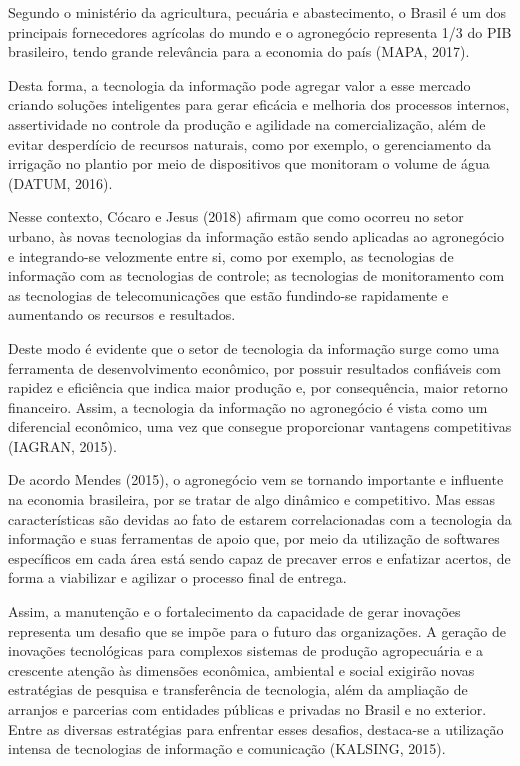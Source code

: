 \documentclass[eso]{bcc}
\begin{document}
Segundo o ministério da agricultura, pecuária e abastecimento, o Brasil é um dos principais 
fornecedores agrícolas do mundo e o agronegócio representa 1/3 do PIB brasileiro, tendo grande 
relevância para a economia do país (MAPA, 2017).

Desta forma, a tecnologia da informação pode agregar valor a esse mercado criando soluções 
inteligentes para gerar eficácia e melhoria dos processos internos, assertividade no controle da 
produção e agilidade na comercialização, além de evitar desperdício de recursos naturais, como 
por exemplo, o gerenciamento da irrigação no plantio por meio de dispositivos que monitoram o 
volume de água (DATUM, 2016).

Nesse contexto, Cócaro e Jesus (2018) afirmam que como ocorreu no setor urbano, às novas 
tecnologias da informação estão sendo aplicadas ao agronegócio e integrando-se velozmente entre si, 
como por exemplo, as tecnologias de informação com as tecnologias de controle; as tecnologias de 
monitoramento com as tecnologias de telecomunicações que estão fundindo-se rapidamente e aumentando 
os recursos e resultados.

Deste modo é evidente que o setor de tecnologia da informação surge como uma ferramenta de 
desenvolvimento econômico, por possuir resultados confiáveis com rapidez e eficiência que 
indica maior produção e, por consequência, maior retorno financeiro. Assim, a tecnologia da 
informação no agronegócio é vista como um diferencial econômico, uma vez que consegue proporcionar 
vantagens competitivas (IAGRAN, 2015).

De acordo Mendes (2015), o agronegócio vem se tornando importante e influente na economia 
brasileira, por se tratar de algo dinâmico e competitivo. Mas essas características são devidas 
ao fato de estarem correlacionadas com a tecnologia da informação e suas ferramentas de apoio que, 
por meio da utilização de softwares específicos em cada área está sendo capaz de precaver erros 
e enfatizar acertos, de forma a viabilizar e agilizar o processo final de entrega.

Assim, a manutenção e o fortalecimento da capacidade de gerar inovações representa um desafio 
que se impõe para o futuro das organizações. A geração de inovações tecnológicas para complexos 
sistemas de produção agropecuária e a crescente atenção às dimensões econômica, ambiental e 
social exigirão novas estratégias de pesquisa e transferência de tecnologia, além da ampliação 
de arranjos e parcerias com entidades públicas e privadas no Brasil e no exterior. 
Entre as diversas estratégias para enfrentar esses desafios, destaca-se a utilização 
intensa de tecnologias de informação e comunicação (KALSING, 2015).
\end{document}
